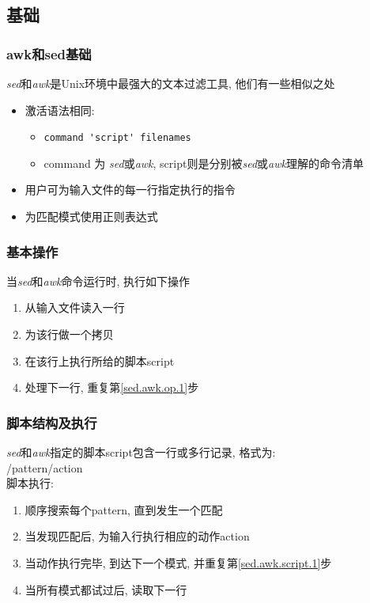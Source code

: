 \documentclass[compress]{beamer}
\begin{document}
\subsection{基础}

\begin{frame}[fragile]
\frametitle{awk和sed基础}

\emph{sed}和\emph{awk}是Unix环境中最强大的文本过滤工具, 他们有一些相似之处
\begin{itemize}
\item 激活语法相同:
    \begin{itemize}
    \item \verb~command 'script' filenames~
    \item command 为 \emph{sed}或\emph{awk}, script则是分别被\emph{sed}或\emph{awk}理解的命令清单
    \end{itemize}
\item 用户可为输入文件的每一行指定执行的指令
\item 为匹配模式使用正则表达式
\end{itemize}
\end{frame}

\begin{frame}
\frametitle{基本操作}

当\emph{sed}和\emph{awk}命令运行时, 执行如下操作
\begin{enumerate}
\item \label{sed.awk.op.1}从输入文件读入一行
\item 为该行做一个拷贝
\item 在该行上执行所给的脚本script
\item 处理下一行, 重复第\ref{sed.awk.op.1}步
\end{enumerate}
\end{frame}

\begin{frame}
\frametitle{脚本结构及执行}

\emph{sed}和\emph{awk}指定的脚本script包含一行或多行记录, 格式为:\\
/pattern/action\\
脚本执行:
\begin{enumerate}
\item \label{sed.awk.script.1}顺序搜索每个pattern, 直到发生一个匹配
\item 当发现匹配后, 为输入行执行相应的动作action
\item 当动作执行完毕, 到达下一个模式, 并重复第\ref{sed.awk.script.1}步
\item 当所有模式都试过后, 读取下一行
\end{enumerate}
\end{frame}
\end{document}

